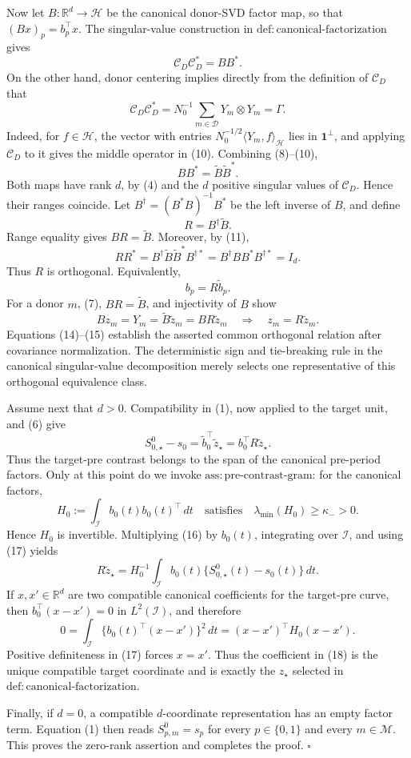 Now let \(B:\mathbb R^d\to\mathcal H\) be the canonical donor-SVD factor map, so that \((Bx)_p=b_p^\top x\).  The singular-value construction in \(\mathrm{def:canonical\mbox{-}factorization}\) gives
\[
 \mathcal C_D\mathcal C_D^*=BB^*. \tag{9}
\]
On the other hand, donor centering implies directly from the definition of \(\mathcal C_D\) that
\[
 \mathcal C_D\mathcal C_D^*
 =N_0^{-1}\sum_{m\in\mathcal D}Y_m\otimes Y_m
 =\Gamma. \tag{10}
\]
Indeed, for \(f\in\mathcal H\), the vector with entries \(N_0^{-1/2}\langle Y_m,f\rangle_{\mathcal H}\) lies in \(\mathbf 1^\perp\), and applying \(\mathcal C_D\) to it gives the middle operator in (10).  Combining (8)--(10),
\[
 BB^*=\widetilde B\widetilde B^*. \tag{11}
\]
Both maps have rank \(d\), by (4) and the \(d\) positive singular values of \(\mathcal C_D\).  Hence their ranges coincide.  Let \(B^\dagger=(B^*B)^{-1}B^*\) be the left inverse of \(B\), and define
\[
 R=B^\dagger\widetilde B. \tag{12}
\]
Range equality gives \(BR=\widetilde B\).  Moreover, by (11),
\[
 RR^*
 =B^\dagger\widetilde B\widetilde B^*B^{\dagger *}
 =B^\dagger BB^*B^{\dagger *}
 =I_d. \tag{13}
\]
Thus \(R\) is orthogonal.  Equivalently,
\[
 b_p=R\widetilde b_p. \tag{14}
\]
For a donor \(m\), (7), \(BR=\widetilde B\), and injectivity of \(B\) show
\[
 Bz_m=Y_m=\widetilde B\widetilde z_m=BR\widetilde z_m
 \quad\Longrightarrow\quad
 z_m=R\widetilde z_m. \tag{15}
\]
Equations (14)--(15) establish the asserted common orthogonal relation after covariance normalization.  The deterministic sign and tie-breaking rule in the canonical singular-value decomposition merely selects one representative of this orthogonal equivalence class.

Assume next that \(d>0\).  Compatibility in (1), now applied to the target unit, and (6) give
\[
 S^0_{0,\star}-s_0
 =\widetilde b_0^\top\widetilde z_\star
 =b_0^\top R\widetilde z_\star. \tag{16}
\]
Thus the target-pre contrast belongs to the span of the canonical pre-period factors.  Only at this point do we invoke \(\mathrm{ass:pre\mbox{-}contrast\mbox{-}gram}\): for the canonical factors,
\[
 H_0:=\int_{\mathcal I}b_0(t)b_0(t)^\top\,dt
 \quad\text{satisfies}\quad
 \lambda_{\min}(H_0)\geq\kappa_->0. \tag{17}
\]
Hence \(H_0\) is invertible.  Multiplying (16) by \(b_0(t)\), integrating over \(\mathcal I\), and using (17) yields
\[
 R\widetilde z_\star
 =H_0^{-1}\int_{\mathcal I}b_0(t)
 \{S^0_{0,\star}(t)-s_0(t)\}\,dt. \tag{18}
\]
If \(x,x'\in\mathbb R^d\) are two compatible canonical coefficients for the target-pre curve, then \(b_0^\top(x-x')=0\) in \(L^2(\mathcal I)\), and therefore
\[
 0=\int_{\mathcal I}\{b_0(t)^\top(x-x')\}^2\,dt
 =(x-x')^\top H_0(x-x'). \tag{19}
\]
Positive definiteness in (17) forces \(x=x'\).  Thus the coefficient in (18) is the unique compatible target coordinate and is exactly the \(z_\star\) selected in \(\mathrm{def:canonical\mbox{-}factorization}\).

Finally, if \(d=0\), a compatible \(d\)-coordinate representation has an empty factor term.  Equation (1) then reads \(S^0_{p,m}=s_p\) for every \(p\in\{0,1\}\) and every \(m\in\mathcal M\).  This proves the zero-rank assertion and completes the proof. \(\square\)
